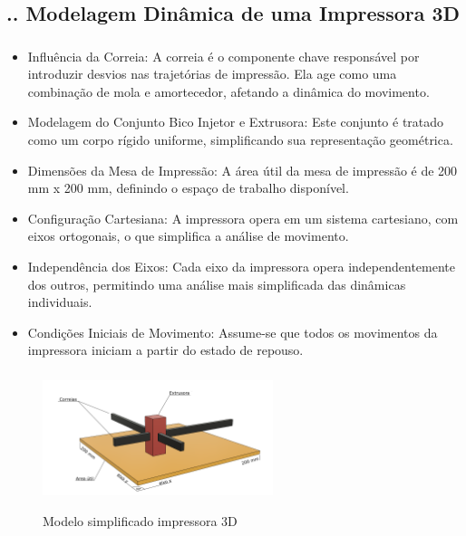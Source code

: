 \documentclass[aspectratio=169]{beamer}
\begin{document}
\subsection{\insertsectionnumber .\insertsubsectionnumber . Modelagem Dinâmica de uma Impressora 3D}

\begin{frame}
  \frametitle{\insertsubsection}
  \begin{itemize}
    \item Influência da Correia: A correia é o componente chave responsável por introduzir desvios nas trajetórias de impressão. Ela age como uma combinação de mola e amortecedor, afetando a dinâmica do movimento.
    \item Modelagem do Conjunto Bico Injetor e Extrusora: Este conjunto é tratado como um corpo rígido uniforme, simplificando sua representação geométrica.
    \item Dimensões da Mesa de Impressão: A área útil da mesa de impressão é de 200 mm x 200 mm, definindo o espaço de trabalho disponível.
    \item Configuração Cartesiana: A impressora opera em um sistema cartesiano, com eixos ortogonais, o que simplifica a análise de movimento.
    \item Independência dos Eixos: Cada eixo da impressora opera independentemente dos outros, permitindo uma análise mais simplificada das dinâmicas individuais.
    \item Condições Iniciais de Movimento: Assume-se que todos os movimentos da impressora iniciam a partir do estado de repouso.
\end{itemize}
\end{frame}

\begin{frame}
  \frametitle{\insertsubsection}
  \begin{figure}[H]
    \centering
    \caption{Modelo simplificado impressora 3D}
    \includegraphics[width=0.6\textwidth]{simple_model}
    \label{fig:simple_model}
  \end{figure}
\end{frame}
\end{document}
